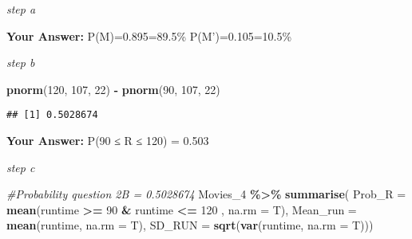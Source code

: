 \documentclass[
]{article}
\newenvironment{Shaded}{\begin{snugshade}}{\end{snugshade}}
\newcommand{\AttributeTok}[1]{\textcolor[rgb]{0.13,0.29,0.53}{#1}}
\newcommand{\CommentTok}[1]{\textcolor[rgb]{0.56,0.35,0.01}{\textit{#1}}}
\newcommand{\DecValTok}[1]{\textcolor[rgb]{0.00,0.00,0.81}{#1}}
\newcommand{\FunctionTok}[1]{\textcolor[rgb]{0.13,0.29,0.53}{\textbf{#1}}}
\newcommand{\NormalTok}[1]{#1}
\newcommand{\OtherTok}[1]{\textcolor[rgb]{0.56,0.35,0.01}{#1}}
\newcommand{\SpecialCharTok}[1]{\textcolor[rgb]{0.81,0.36,0.00}{\textbf{#1}}}
\newcommand{\StringTok}[1]{\textcolor[rgb]{0.31,0.60,0.02}{#1}}
\begin{document}
\emph{step a}

\begin{Shaded}
\end{Shaded}

\textbf{Your Answer:} P(M)=0.895=89.5\% P(M')=0.105=10.5\%

\emph{step b}

\begin{Shaded}
\begin{Highlighting}[]
\FunctionTok{pnorm}\NormalTok{(}\DecValTok{120}\NormalTok{, }\DecValTok{107}\NormalTok{, }\DecValTok{22}\NormalTok{) }\SpecialCharTok{{-}} \FunctionTok{pnorm}\NormalTok{(}\DecValTok{90}\NormalTok{, }\DecValTok{107}\NormalTok{, }\DecValTok{22}\NormalTok{)}
\end{Highlighting}
\end{Shaded}

\begin{verbatim}
## [1] 0.5028674
\end{verbatim}

\textbf{Your Answer:} P(90 ≤ R ≤ 120) = 0.503

\emph{step c}

\begin{Shaded}
\begin{Highlighting}[]
\CommentTok{\#Probability question 2B = 0.5028674}
\NormalTok{Movies\_4 }\SpecialCharTok{\%\textgreater{}\%}
  \FunctionTok{summarise}\NormalTok{(}
    \AttributeTok{Prob\_R =} \FunctionTok{mean}\NormalTok{(runtime }\SpecialCharTok{\textgreater{}=} \DecValTok{90} \SpecialCharTok{\&}\NormalTok{ runtime }\SpecialCharTok{\textless{}=} \DecValTok{120}\NormalTok{ , }\AttributeTok{na.rm =}\NormalTok{ T),}
    \AttributeTok{Mean\_run =} \FunctionTok{mean}\NormalTok{(runtime, }\AttributeTok{na.rm =}\NormalTok{ T),}
    \AttributeTok{SD\_RUN =} \FunctionTok{sqrt}\NormalTok{(}\FunctionTok{var}\NormalTok{(runtime, }\AttributeTok{na.rm =}\NormalTok{ T)))}
\end{Highlighting}
\end{Shaded}
\end{document}
